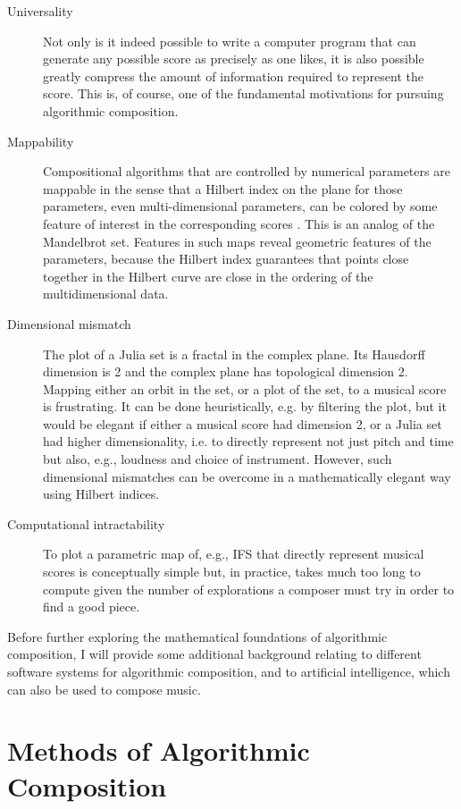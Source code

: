 \documentclass[11pt]{amsart}
\begin{document}
\begin{description}
\item[Universality] Not only is it indeed possible to write a computer program that can generate any possible score as precisely as one likes, it is also possible greatly compress the amount of information required to represent the score. This is, of course, one of the fundamental motivations for pursuing algorithmic composition.
\item[Mappability] Compositional algorithms that are controlled by numerical parameters are mappable in the sense that a Hilbert index on the plane for those parameters, even multi-dimensional parameters, can be colored by some feature of interest in the corresponding scores \cite{hamilton2007compact}. This is an analog of the Mandelbrot set. Features in such maps reveal geometric features of the parameters, because the Hilbert index guarantees that points close together in the Hilbert curve are close in the ordering of the multidimensional data.
\item[Dimensional mismatch] The plot of a Julia set is a fractal in the complex plane. Its Hausdorff dimension is 2 and the complex plane has topological dimension 2. Mapping either an orbit in the set, or a plot of the set, to a musical score is frustrating. It can be done heuristically, e.g. by filtering the plot, but it would be elegant if either a musical score had dimension 2, or a Julia set had higher dimensionality, i.e. to directly represent not just pitch and time but also, e.g., loudness and choice of instrument. However, such  dimensional mismatches can be overcome in a mathematically elegant way using Hilbert indices. 
\item[Computational intractability] To plot a parametric map of, e.g., IFS that directly represent musical scores is conceptually simple but, in practice, takes much too long to compute given the number of explorations a composer must try in order to find a good piece.
\end{description}

Before further exploring the mathematical foundations of algorithmic composition, I will provide some additional background relating to different software systems for algorithmic composition, and to artificial intelligence, which can also be used to compose music.

\section{Methods of Algorithmic Composition}
\end{document}
